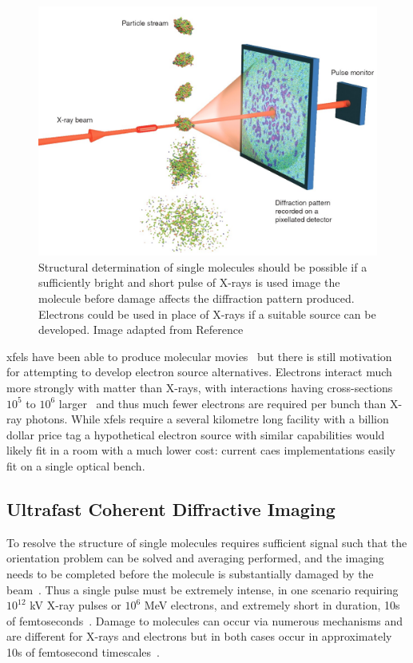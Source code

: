 \begin{figure}
    \center
    \includegraphics[width=0.65\linewidth]{0intro/Figs/single_molecule_cdi.jpg}
    \caption[Structural determination of single molecules.]{Structural determination of single molecules should be possible if a sufficiently bright and short pulse of X-rays is used image the molecule before damage affects the diffraction pattern produced. Electrons could be used in place of X-rays if a suitable source can be developed. Image adapted from Reference~\cite{gaffney_imaging_2007}}
    \label{figure:molecule_cdi}
\end{figure}

\Glspl{xfel} have been able to produce molecular movies~\cite{kupitz_structural_2016,pande_femtosecond_2016,nango_three-dimensional_2016} but there is still motivation for attempting to develop electron source alternatives.
Electrons interact much more strongly with matter than X-rays, with interactions having cross-sections $10^5$ to $10^6$ larger~\cite{sciaini_femtosecond_2011} and thus much fewer electrons are required per bunch than X-ray photons.
While \glspl{xfel} require a several kilometre long facility with a billion dollar price tag a hypothetical electron source with similar capabilities would likely fit in a room with a much lower cost: current \gls{caes} implementations easily fit on a single optical bench.

\subsection{Ultrafast Coherent Diffractive Imaging}

To resolve the structure of single molecules requires sufficient signal such that the orientation problem can be solved and averaging performed, and the imaging needs to be completed before the molecule is substantially damaged by the beam~\cite{huldt_diffraction_2003}.
Thus a single pulse must be extremely intense, in one scenario requiring $10^{12}$ \unit[8]{kV} X-ray pulses or $10^6$ \unit[3]{MeV} electrons, and extremely short in duration, 10s of femtoseconds~\cite{chapman_femtosecond_2006,spence_outrunning_2017}.
Damage to molecules can occur via numerous mechanisms and are different for X-rays and electrons but in both cases occur in approximately 10s of femtosecond timescales~\cite{spence_outrunning_2017}.


